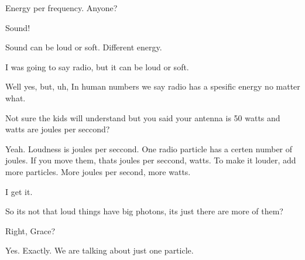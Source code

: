 \tek Energy per frequency. Anyone?

\kev Sound!

\gr Sound can be loud or soft. Different energy.

\ker I was going to say radio, but it can be loud or soft.

\gr Well yes, but, uh, In human numbers we say radio has a spesific energy no matter what.

\tek Not sure the kids will understand but you said your antenna is 50 watts and watts are joules per seccond?

\gr Yeah. Loudness is joules per seccond. One radio particle has a certen number of joules. If you move them, thats joules per seccond, watts. To make it louder, add more particles. More joules per second, more watts.

\ker I get it.

\kev So its not that loud things have big photons, its just there are more of them?

\tek Right, Grace?

\gr Yes. Exactly. We are talking about just one particle.
